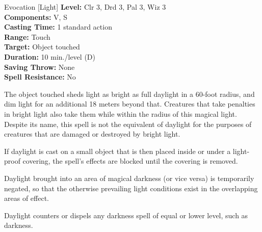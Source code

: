 {Evocation [Light]}
{
	\textbf{Level:}
	Clr 3, Drd 3, Pal 3, Wiz 3\\
	\textbf{Components:}
	V, S\\
	\textbf{Casting Time:}
	1 standard action\\
	\textbf{Range:}
	Touch\\
	\textbf{Target:}
	Object touched\\
	\textbf{Duration:}
	10 min./level (D)\\
	\textbf{Saving Throw:}
	None\\
	\textbf{Spell Resistance:}
	No\\
}
{
	The object touched sheds light as bright as full daylight in a 60-foot radius, and dim light for an additional 18 meters beyond that. Creatures that take penalties in bright light also take them while within the radius of this magical light. Despite its name, this spell is not the equivalent of daylight for the purposes of creatures that are damaged or destroyed by bright light.

	If daylight is cast on a small object that is then placed inside or under a light-proof covering, the spell's effects are blocked until the covering is removed.

	Daylight brought into an area of magical darkness (or vice versa) is temporarily negated, so that the otherwise prevailing light conditions exist in the overlapping areas of effect.

	Daylight counters or dispels any darkness spell of equal or lower level, such as darkness.

}

